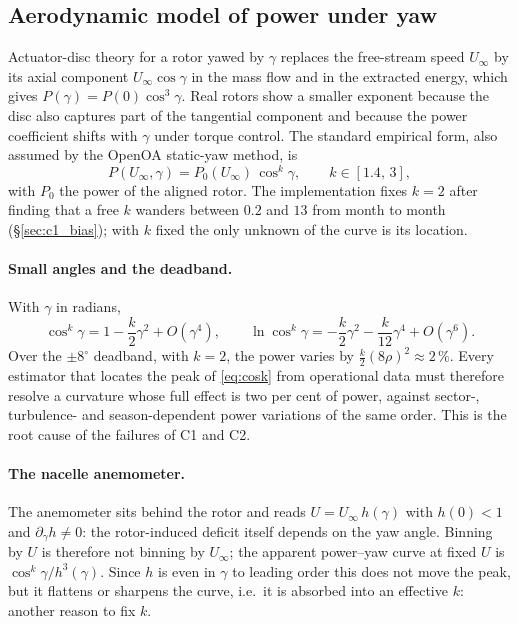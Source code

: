 \documentclass[11pt,a4paper]{article}
\theoremstyle{remark}
\newcommand{\dg}{^{\circ}}
\begin{document}
\subsection{Aerodynamic model of power under yaw}\label{sec:aero}
Actuator-disc theory for a rotor yawed by $\gamma$ replaces the free-stream speed
$U_\infty$ by its axial component $U_\infty\cos\gamma$ in the mass flow and in
the extracted energy, which gives $P(\gamma)=P(0)\cos^3\gamma$. Real rotors show
a smaller exponent because the disc also captures part of the tangential
component and because the power coefficient shifts with $\gamma$ under torque
control. The standard empirical form, also assumed by the OpenOA static-yaw
method, is
\begin{equation}
  P(U_\infty,\gamma) = P_0(U_\infty)\,\cos^k\gamma ,
  \qquad k\in[1.4,\,3],
  \label{eq:cosk}
\end{equation}
with $P_0$ the power of the aligned rotor. The implementation fixes $k=2$ after
finding that a free $k$ wanders between $0.2$ and $13$ from month to month
(\S\ref{sec:c1_bias}); with $k$ fixed the only unknown of the curve is its
location.

\paragraph{Small angles and the deadband.} With $\gamma$ in radians,
\begin{equation}
  \cos^k\gamma = 1 - \frac{k}{2}\gamma^2 + O(\gamma^4),
  \qquad
  \ln\cos^k\gamma = -\frac{k}{2}\gamma^2 - \frac{k}{12}\gamma^4 + O(\gamma^6).
  \label{eq:cosk_small}
\end{equation}
Over the $\pm8\dg$ deadband, with $k=2$, the power varies by
$\tfrac{k}{2}(8\rho)^2 \approx 2\,\%$. Every estimator that locates the peak of
\eqref{eq:cosk} from operational data must therefore resolve a curvature whose
full effect is two per cent of power, against sector-, turbulence- and
season-dependent power variations of the same order. This is the root cause of
the failures of C1 and C2.

\paragraph{The nacelle anemometer.} The anemometer sits behind the rotor and
reads $U = U_\infty\, h(\gamma)$ with $h(0)<1$ and $\partial_\gamma h\ne0$: the
rotor-induced deficit itself depends on the yaw angle. Binning by $U$ is
therefore not binning by $U_\infty$; the apparent power--yaw curve at fixed $U$
is $\cos^k\gamma/h^3(\gamma)$. Since $h$ is even in $\gamma$ to leading order
this does not move the peak, but it flattens or sharpens the curve, i.e.\ it is
absorbed into an effective $k$: another reason to fix $k$.
\end{document}
